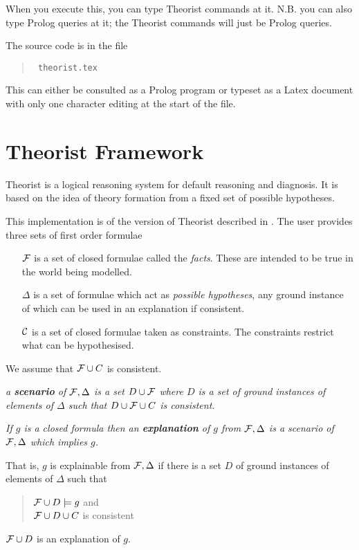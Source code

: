 When you execute this, you can type Theorist commands at it. N.B. you can also
type Prolog queries at it; the Theorist commands will just be Prolog queries.

The source code is in the file
\begin{quote}\tt
theorist.tex
\end{quote}
This can either be consulted as a Prolog program or typeset as a Latex
document with only one character editing at the start of the file.
\section{Theorist Framework} \label{theorist}

Theorist \cite{poole:lf,pga,poole:ep,poole:meth} is a logical
reasoning system for default reasoning and diagnosis. It is based on
the idea of theory formation from a fixed set of possible hypotheses.

This implementation is of the version of Theorist described in
\cite{poole:comp}.  The user provides three sets of first order
formulae
\begin{itemize}
\item[${\cal F}$] is a set of closed formulae called the {\em facts\/}.
These are intended to be true in the world being modelled.
\item[$\Delta$] is a set of formulae which
act as {\em possible hypotheses}, any ground instance of which
can be used in an explanation if consistent.
\item[$\cal C$] is a set of closed formulae taken as constraints.
The constraints restrict what can be hypothesised.
\end{itemize}

We assume that ${\cal F}\cup C$ is consistent.

\begin{definition} \em
a {\bf  scenario} of ${\cal F},\Delta$ is a set $D \cup {\cal F}$ where
$D$ is a set of ground instances of elements
of $\Delta$ such that $D\cup {\cal F} \cup C$ is consistent.
\end{definition}

\begin{definition} \em
If $g$ is a closed formula then an {\bf explanation} of $g$ from ${\cal F},\Delta$
is a  scenario of ${\cal F},\Delta$ which implies $g$.
\end{definition}
That is, $g$ is explainable from ${\cal F},\Delta$ if there is a set
$D$ of ground instances of elements of $\Delta$ such that
\begin{quote}
${\cal F} \cup D \models g$ and\\
${\cal F} \cup D \cup C$ is consistent
\end{quote}
${\cal F} \cup D$ is an explanation of $g$.

